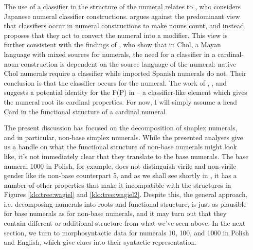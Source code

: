 \documentclass[output=paper]{langscibook}
\begin{document}


The use of a classifier in the structure of the numeral relates to \citet{sudo2016semantic}, who considers Japanese numeral classifier constructions. \citet{sudo2016semantic} argues against the predominant view that classifiers occur in numeral constructions to make nouns count, and instead proposes that they act to convert the numeral into a modifier. This view is further consistent with the findings of \citet{bale2014classifiers}, who show that in Chol, a Mayan language with mixed sources for numerals, the need for a classifier in a cardinal-noun construction is dependent on the source language of the numeral: native Chol numerals require a classifier while imported Spanish numerals do not. Their conclusion is that the classifier occurs for the numeral. The work of \citet{wagiel2017several,wagiel2018fasl}, \citet{sudo2016semantic}, and \citet{bale2014classifiers} suggests a potential identity for the F(P) in  -- a classifier-like element which gives the numeral root its cardinal properties. For now, I will simply assume a head Card in the functional structure of a cardinal numeral.

The present discussion has focused on the decomposition of simplex numerals, and in particular, non-base simplex numerals. While the presented analyses give us a handle on what the functional structure of non-base numerals might look like, it's not immediately clear that they translate to the base numerals. The base numeral 1000 in Polish, for example, does not distinguish virile and non-virile gender like its non-base counterpart 5, and as we shall see shortly in , it has a number of other properties that make it incompatible with the structures in Figures \ref{klo:tree:wagiel} and \ref{klo:tree:wagiel2}. Despite this, the general approach, i.e. decomposing numerals into roots and functional structure, is just as plausible for base numerals as for non-base numerals, and it may turn out that they contain different or additional structure from what we've seen above. In the next section, we turn to morphosyntactic data for numerals 10, 100, and 1000 in Polish and English, which give clues into their syntactic representation.
\end{document}
